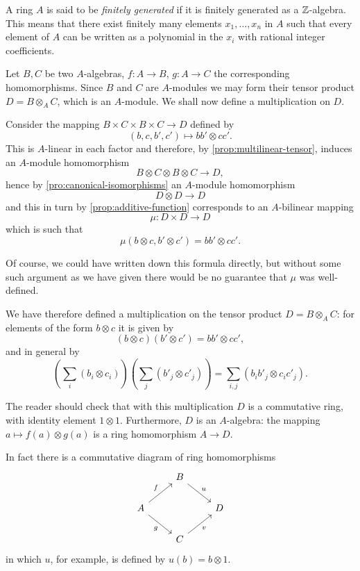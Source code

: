 A ring $A$ is said to be \emph{finitely generated} if it is finitely generated as a $\mathbb{Z}$-algebra. This means that there exist finitely many elements $x_1, \ldots, x_n$ in $A$ such that every element of $A$ can be written as a polynomial in the $x_i$ with rational integer coefficients.


Let $B, C$ be two $A$-algebras, $f \colon A \to B$, $g \colon A \to C$ the corresponding homomorphisms. Since $B$ and $C$ are $A$-modules we may form their tensor product $D = B \otimes_A C$, which is an $A$-module. We shall now define a multiplication on $D$.

Consider the mapping $B \times C \times B \times C \to D$ defined by
\[
    (b, c, b', c') \mapsto bb' \otimes cc'.
\]
This is $A$-linear in each factor and therefore, by \eqref{prop:multilinear-tensor}, induces an $A$-module homomorphism
\[
    B \otimes C \otimes B \otimes C \to D,
\]
hence by \eqref{pro:canonical-isomorphisms} an $A$-module homomorphism
\[
    D \otimes D \to D
\]
and this in turn by \eqref{prop:additive-function} corresponds to an $A$-bilinear mapping
\[
\mu : D \times D \to D
\]
which is such that
\[
\mu(b \otimes c, b' \otimes c') = bb' \otimes cc'.
\]

Of course, we could have written down this formula directly, but without some such argument as we have given there would be no guarantee that $\mu$ was well-defined.

We have therefore defined a multiplication on the tensor product $D = B \otimes_A C$: for elements of the form $b \otimes c$ it is given by
\[
(b \otimes c)(b' \otimes c') = bb' \otimes cc',
\]
and in general by
\[
\left(\sum_i (b_i \otimes c_i)\right)\left(\sum_j (b'_j \otimes c'_j)\right) = \sum_{i,j} (b_i b'_j \otimes c_i c'_j).
\]

The reader should check that with this multiplication $D$ is a commutative ring, with identity element $1 \otimes 1$. Furthermore, $D$ is an $A$-algebra: the mapping $a \mapsto f(a) \otimes g(a)$ is a ring homomorphism $A \to D$.

In fact there is a commutative diagram of ring homomorphisms
\[
\begin{tikzcd}
 & B \arrow[rd, "u"] & \\
A \arrow[ru, "f"] \arrow[rd, "g"'] & & D \\
 & C \arrow[ru, "v"'] &
\end{tikzcd}
\]
in which $u$, for example, is defined by $u(b) = b \otimes 1$.


